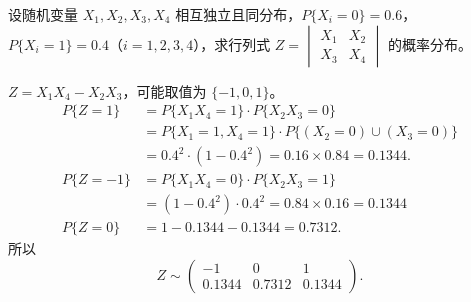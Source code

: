 ﻿\documentclass[lang=cn,11pt]{elegantbook}
\begin{document}
\begin{exercise}[行列式分布] \label{exer:3-c6}
设随机变量 $X_1, X_2, X_3, X_4$ 相互独立且同分布，$P\{X_i=0\} = 0.6$，$P\{X_i=1\} = 0.4$（$i=1,2,3,4$），求行列式 $Z = \begin{vmatrix} X_1 & X_2 \\ X_3 & X_4 \end{vmatrix}$ 的概率分布。
\end{exercise}
\begin{solution}
$Z = X_1X_4 - X_2X_3$，可能取值为 $\{-1, 0, 1\}$。
\begin{align*}
P\{Z=1\} &= P\{X_1X_4=1\}\cdot P\{X_2X_3=0\}\\
& = P\{X_1=1,X_4=1\}\cdot P\{(X_2=0)\cup(X_3=0)\}\\
&= 0.4^2 \cdot (1-0.4^2) = 0.16 \times 0.84 = 0.1344.\\
P\{Z=-1\} &= P\{X_1X_4=0\}\cdot P\{X_2X_3=1\} \\
&= (1-0.4^2)\cdot 0.4^2 = 0.84 \times 0.16 = 0.1344\\
P\{Z=0\} &= 1 - 0.1344 - 0.1344 = 0.7312.
\end{align*}
所以
\[
Z \sim \begin{pmatrix} -1 & 0 & 1 \\ 0.1344 & 0.7312 & 0.1344 \end{pmatrix}.
\]
\end{solution}
\end{document}
